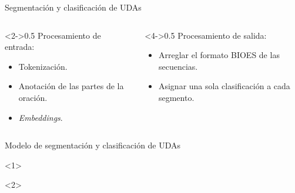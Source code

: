 \documentclass{beamer}
\begin{document}
\begin{frame}{Segmentación y clasificación de UDAs}
    \begin{columns}[T]
        \begin{column}<2->{0.5\textwidth}
            Procesamiento de entrada:
            \begin{itemize}
                \item Tokenización.
                \item Anotación de las partes de la oración.
                \item \textit{Embeddings}.
            \end{itemize}
        \end{column}
        \begin{column}<4->{0.5\textwidth}
            Procesamiento de salida:
            \begin{itemize}
                \item Arreglar el formato BIOES de las secuencias.
                \item Asignar una sola clasificación a cada segmento.
            \end{itemize}
        \end{column}
    \end{columns}
\end{frame}

\begin{frame}{Modelo de segmentación y clasificación de UDAs}
    \begin{onlyenv}<1>
        \begin{center}
            
        \end{center}
    \end{onlyenv}
    \begin{onlyenv}<2>
        \begin{center}
            
        \end{center}
    \end{onlyenv}
\end{frame}
\end{document}
